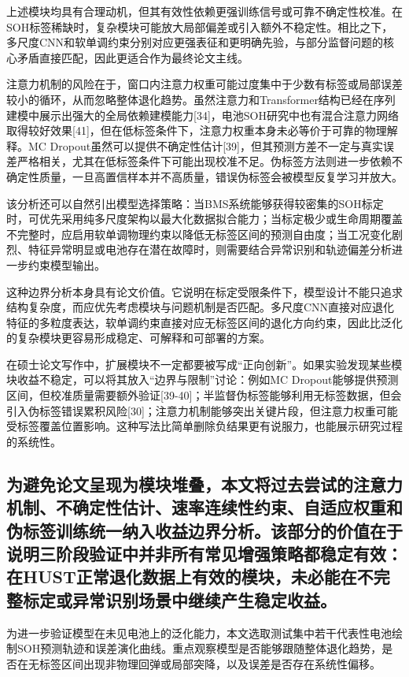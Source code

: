 \documentclass[12pt, a4paper]{ctexart}
\begin{document}
上述模块均具有合理动机，但其有效性依赖更强训练信号或可靠不确定性校准。在SOH标签稀缺时，复杂模块可能放大局部偏差或引入额外不稳定性。相比之下，多尺度CNN和软单调约束分别对应更强表征和更明确先验，与部分监督问题的核心矛盾直接匹配，因此更适合作为最终论文主线。


注意力机制的风险在于，窗口内注意力权重可能过度集中于少数有标签或局部误差较小的循环，从而忽略整体退化趋势。虽然注意力和Transformer结构已经在序列建模中展示出强大的全局依赖建模能力[34]，电池SOH研究中也有混合注意力网络取得较好效果[41]，但在低标签条件下，注意力权重本身未必等价于可靠的物理解释。MC Dropout虽然可以提供不确定性估计[39]，但其预测方差不一定与真实误差严格相关，尤其在低标签条件下可能出现校准不足。伪标签方法则进一步依赖不确定性质量，一旦高置信样本并不高质量，错误伪标签会被模型反复学习并放大。


该分析还可以自然引出模型选择策略：当BMS系统能够获得较密集的SOH标定时，可优先采用纯多尺度架构以最大化数据拟合能力；当标定极少或生命周期覆盖不完整时，应启用软单调物理约束以降低无标签区间的预测自由度；当工况变化剧烈、特征异常明显或电池存在潜在故障时，则需要结合异常识别和轨迹偏差分析进一步约束模型输出。


这种边界分析本身具有论文价值。它说明在标定受限条件下，模型设计不能只追求结构复杂度，而应优先考虑模块与问题机制是否匹配。多尺度CNN直接对应退化特征的多粒度表达，软单调约束直接对应无标签区间的退化方向约束，因此比泛化的复杂模块更容易形成稳定、可解释和可部署的方案。


在硕士论文写作中，扩展模块不一定都要被写成“正向创新”。如果实验发现某些模块收益不稳定，可以将其放入“边界与限制”讨论：例如MC Dropout能够提供预测区间，但校准质量需要额外验证[39-40]；半监督伪标签能够利用无标签数据，但会引入伪标签错误累积风险[30]；注意力机制能够突出关键片段，但注意力权重可能受标签覆盖位置影响。这种写法比简单删除负结果更有说服力，也能展示研究过程的系统性。



\subsection{为避免论文呈现为模块堆叠，本文将过去尝试的注意力机制、不确定性估计、速率连续性约束、自适应权重和伪标签训练统一纳入收益边界分析。该部分的价值在于说明三阶段验证中并非所有常见增强策略都稳定有效：在HUST正常退化数据上有效的模块，未必能在不完整标定或异常识别场景中继续产生稳定收益。}

为进一步验证模型在未见电池上的泛化能力，本文选取测试集中若干代表性电池绘制SOH预测轨迹和误差演化曲线。重点观察模型是否能够跟随整体退化趋势，是否在无标签区间出现非物理回弹或局部突降，以及误差是否存在系统性偏移。
\end{document}
